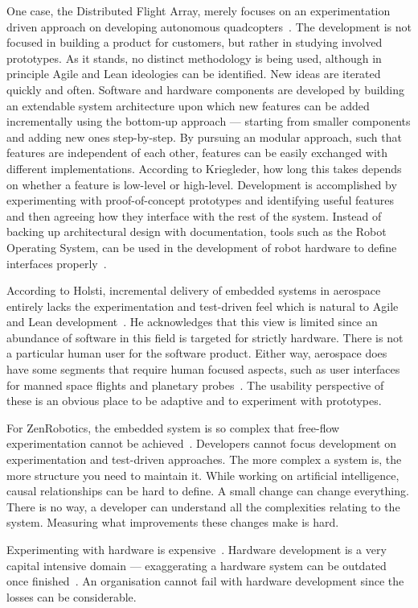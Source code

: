\documentclass[english]{tktltiki2}
\begin{document}
One case, the Distributed Flight Array, merely focuses on an experimentation driven approach on developing autonomous quadcopters~\cite{Kri15}. The development is not focused in building a product for customers, but rather in studying involved prototypes. As it stands, no distinct methodology is being used, although in principle Agile and Lean ideologies can be identified. New ideas are iterated quickly and often. Software and hardware components are developed by building an extendable system architecture upon which new features can be added incrementally using the bottom-up approach — starting from smaller components and adding new ones step-by-step. By pursuing an modular approach, such that features are independent of each other, features can be easily exchanged with different implementations. According to Kriegleder, how long this takes depends on whether a feature is low-level or high-level. Development is accomplished by experimenting with proof-of-concept prototypes and identifying useful features and then agreeing how they interface with the rest of the system. Instead of backing up architectural design with documentation, tools such as the Robot Operating System, can be used in the development of robot hardware to define interfaces properly~\cite{ROS}.

According to Holsti, incremental delivery of embedded systems in aerospace entirely lacks the experimentation and test-driven feel which is natural to Agile and Lean development~\cite{Hol15b}. He acknowledges that this view is limited since an abundance of software in this field is targeted for strictly hardware. There is not a particular human user for the software product. Either way, aerospace does have some segments that require human focused aspects, such as user interfaces for manned space flights and planetary probes~\cite{Hol15b}. The usability perspective of these is an obvious place to be adaptive and to experiment with prototypes.

For ZenRobotics, the embedded system is so complex that free-flow experimentation cannot be achieved~\cite{Hol15a}. Developers cannot focus development on experimentation and test-driven approaches. The more complex a system is, the more structure you need to maintain it. While working on artificial intelligence, causal relationships can be hard to define. A small change can change everything. There is no way, a developer can understand all the complexities relating to the system. Measuring what improvements these changes make is hard.

Experimenting with hardware is expensive~\cite{BT15, Hol15a, Hol15b}. Hardware development is a very capital intensive domain — exaggerating a hardware system can be outdated once finished~\cite{Hol15a}. An organisation cannot fail with hardware development since the losses can be considerable.
\end{document}
